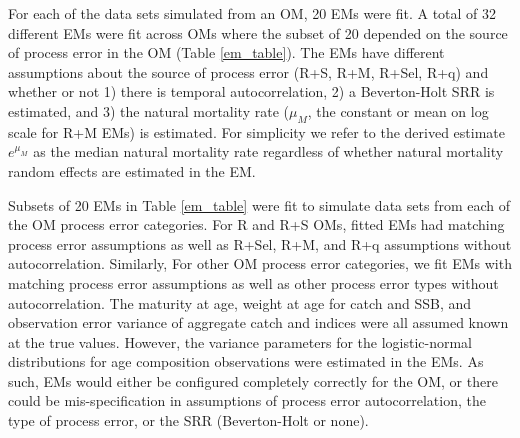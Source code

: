 \documentclass[
  12pt,
]{article}
\providecommand{\DIFadd}[1]{{\protect\color{blue}\uwave{#1}}} %
\providecommand{\DIFaddbegin}{} %
\providecommand{\DIFaddend}{} %
\providecommand{\DIFdelbegin}{} %
\providecommand{\DIFdelend}{} %
\newcommand{\DIFscaledelfig}{0.5}
\newlength{\DIFdelgraphicswidth} %
\newlength{\DIFdelgraphicsheight} %
\newcommand{\DIFaddincludegraphics}[2][]{{\color{blue}\fbox{\DIFOincludegraphics[#1]{#2}}}} %
\newcommand{\DIFdelincludegraphics}[2][]{%
\sbox{\DIFdelgraphicsbox}{\DIFOincludegraphics[#1]{#2}}%
\settoboxwidth{\DIFdelgraphicswidth}{\DIFdelgraphicsbox} %
\settoboxtotalheight{\DIFdelgraphicsheight}{\DIFdelgraphicsbox} %
\scalebox{\DIFscaledelfig}{%
\parbox[b]{\DIFdelgraphicswidth}{\usebox{\DIFdelgraphicsbox}\\[-\baselineskip] \rule{\DIFdelgraphicswidth}{0em}}\llap{\resizebox{\DIFdelgraphicswidth}{\DIFdelgraphicsheight}{%
\setlength{\unitlength}{\DIFdelgraphicswidth}%
\begin{picture}(1,1)%
\thicklines\linethickness{2pt} %
{\color[rgb]{1,0,0}\put(0,0){\framebox(1,1){}}}%
{\color[rgb]{1,0,0}\put(0,0){\line( 1,1){1}}}%
{\color[rgb]{1,0,0}\put(0,1){\line(1,-1){1}}}%
\end{picture}%
}\hspace*{3pt}}} %
} %
\DeclareRobustCommand{\DIFaddbegin}{\DIFOaddbegin \let\includegraphics\DIFaddincludegraphics} %
\DeclareRobustCommand{\DIFaddend}{\DIFOaddend \let\includegraphics\DIFOincludegraphics} %
\DeclareRobustCommand{\DIFdelbegin}{\DIFOdelbegin \let\includegraphics\DIFdelincludegraphics} %
\DeclareRobustCommand{\DIFdelend}{\DIFOaddend \let\includegraphics\DIFOincludegraphics} %
\begin{document}
For each of the data sets simulated from an OM, 20 EMs were fit. A total
of 32 different EMs were fit across OMs where the subset of 20 depended
on the source of process error in the OM (Table \ref{em_table}). The EMs
have different assumptions about the source of process error (R+S, R+M,
R+Sel, R+q) and whether or not 1) there is temporal autocorrelation, 2)
a Beverton-Holt SRR is estimated, and 3) the natural mortality rate
(\(\mu_M\), the constant or mean on log scale for R+M EMs) is estimated.
For simplicity we refer to the derived estimate \(e^{\mu_M}\) as the
median natural mortality rate regardless of whether natural mortality
random effects are estimated in the EM.

Subsets of 20 EMs in Table \ref{em_table} were fit to simulate data sets
from each of the OM process error categories. For R and R+S OMs, fitted
EMs had matching process error assumptions as well as R+Sel, R+M, and
R+q assumptions without autocorrelation. Similarly, For other OM process
error categories, we fit EMs with matching process error assumptions as
well as other process error types without autocorrelation. The maturity
at age, weight at age for catch and SSB, and observation error variance
of aggregate catch and indices were all assumed known at the true
values. However, the variance parameters for the logistic-normal
distributions for age composition observations were estimated in the
EMs. As such, EMs would either be configured completely correctly for
the OM, or there could be mis-specification in assumptions of process
error autocorrelation, the type of process error, or the SRR
(Beverton-Holt or none).

\DIFdelbegin %
\DIFdelend \DIFaddbegin \subsection*{\DIFadd{Measures of reliability}}\label{measures-of-reliability}
\DIFaddend {}

\DIFdelbegin %
\DIFdelend \DIFaddbegin \subsubsection*{\DIFadd{Convergence}}\label{convergence}
\DIFaddend {}
\end{document}
